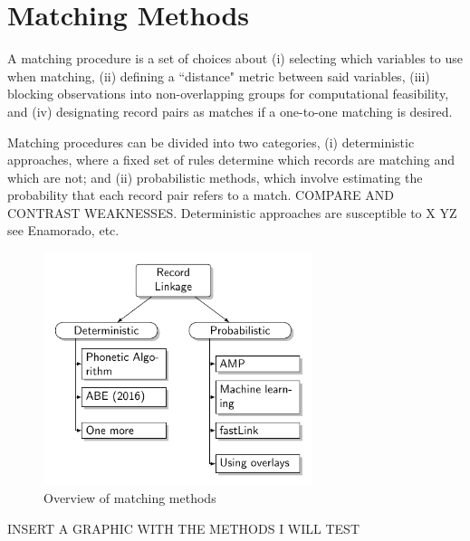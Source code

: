 \documentclass[12pt]{article}
\begin{document}
 

\newpage
\section{Matching Methods}

A matching procedure is a set of choices about (i) selecting which variables to use when matching, (ii) defining a ``distance" metric between said variables, (iii) blocking observations into non-overlapping groups for computational feasibility, and (iv) designating record pairs as matches if a one-to-one matching is desired.    

Matching procedures can be divided into two categories, (i) deterministic approaches, where a fixed set of rules determine which records are matching and which are not; and (ii) probabilistic methods, which involve estimating the probability that each record pair refers to a match.  COMPARE AND CONTRAST WEAKNESSES.   Deterministic approaches are susceptible to X YZ  see Enamorado, etc. 

\begin{figure}[h!]
\centering
\caption{Overview of matching methods}
\includegraphics[width=0.7\textwidth]{./RecordLinkageGraphics.pdf}
\end{figure}

INSERT A GRAPHIC WITH THE METHODS I WILL TEST
\end{document}
